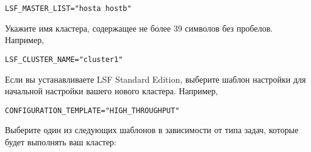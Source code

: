 \begin{lstlisting}
LSF_MASTER_LIST="hosta hostb"
\end{lstlisting}

Укажите имя кластера, содержащее не более 39 символов без пробелов. Например,

\begin{lstlisting}
LSF_CLUSTER_NAME="cluster1"
\end{lstlisting}

Если вы устанавливаете LSF Standard Edition, выберите шаблон настройки для начальной настройки вашего нового кластера. Например,

\begin{lstlisting}
CONFIGURATION_TEMPLATE="HIGH_THROUGHPUT"
\end{lstlisting}

Выберите один из следующих шаблонов в зависимости от типа задач, которые будет выполнять ваш кластер:

